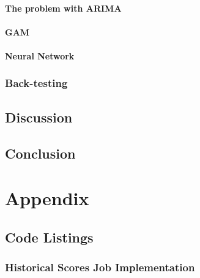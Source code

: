 \documentclass[11pt,english,a4paper,hidelinks]{book}
\begin{document}
\subsection{The problem with ARIMA}

\subsection{GAM}

\subsection{Neural Network}

\section{Back-testing}



\chapter{Discussion}

\chapter{Conclusion}

\printbibliography[heading=bibintoc, title=Bibliography]
\label{sec:biblio}
\newpage

\part{Appendix}

\chapter{Code Listings}
\section{Historical Scores Job Implementation}
\label{app:historical_scores_job}
\end{document}
